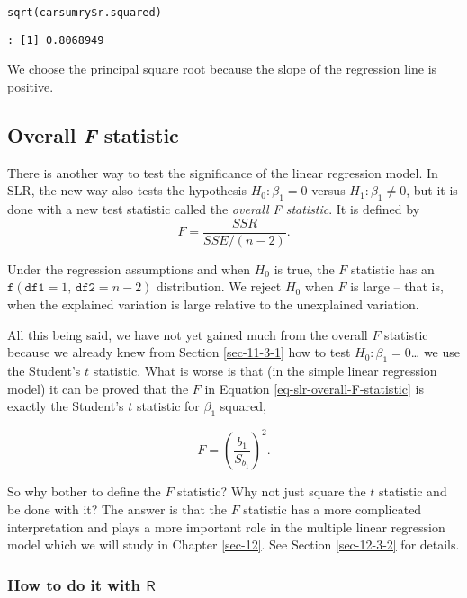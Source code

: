 \begin{verbatim}
sqrt(carsumry$r.squared)
\end{verbatim}

\begin{verbatim}
: [1] 0.8068949
\end{verbatim}

We choose the principal square root because the slope of the
regression line is positive.

\subsection{Overall \emph{F} statistic}
\label{sec-11-3-3}

There is another way to test the significance of the linear regression
model. In SLR, the new way also tests the hypothesis
\(H_{0}:\beta_{1}=0\) versus \(H_{1}:\beta_{1}\neq0\), but it is done
with a new test statistic called the \emph{overall F statistic}. It is
defined by
\begin{equation}
\label{eq-slr-overall-F-statistic}
F=\frac{SSR}{SSE/(n-2)}.
\end{equation}

Under the regression assumptions and when \(H_{0}\) is true, the \(F\)
statistic has an \(\mathtt{f}(\mathtt{df1}=1,\,\mathtt{df2}=n-2)\)
distribution. We reject \(H_{0}\) when \(F\) is large -- that is, when
the explained variation is large relative to the unexplained
variation.

All this being said, we have not yet gained much from the overall
\(F\) statistic because we already knew from Section
\ref{sec-11-3-1} how to test \(H_{0}:\beta_{1} =
0\)\ldots{} we use the Student's \(t\) statistic. What is worse is that (in
the simple linear regression model) it can be proved that the \(F\) in
Equation \eqref{eq-slr-overall-F-statistic} is exactly the Student's
\(t\) statistic for \(\beta_{1}\) squared,

\begin{equation}
F=\left(\frac{b_{1}}{S_{b_{1}}}\right)^{2}.
\end{equation}

So why bother to define the \(F\) statistic? Why not just square the
\(t\) statistic and be done with it? The answer is that the \(F\)
statistic has a more complicated interpretation and plays a more
important role in the multiple linear regression model which we will
study in Chapter \ref{sec-12}. See Section
\ref{sec-12-3-2} for details.

\subsubsection{How to do it with \(\mathsf{R}\)}
\label{sec-11-3-3-1}

